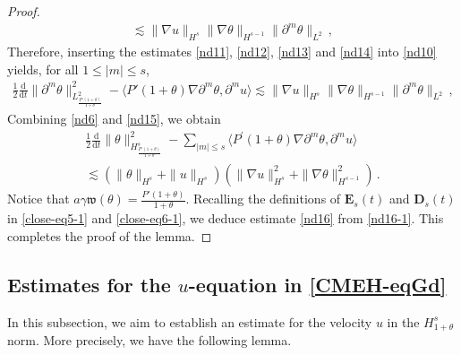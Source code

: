 \documentclass[reqno,11pt]{amsart}
\numberwithin{equation}{section}
\def\d{\mathrm{d}}
\def\w{\mathfrak{w}}
\begin{document}
\begin{proof}
\begin{equation}
\begin{aligned}
\lesssim \|\nabla u\|_{H^s} \|\nabla \theta\|_{H^{s-1}} \|\partial^m\theta\|_{L^2} \,,
\end{aligned}
\end{equation}
Therefore, inserting the estimates \eqref{nd11}, \eqref{nd12}, \eqref{nd13} and \eqref{nd14} into \eqref{nd10} yields, for all $1\le |m|\le s$,
\begin{equation}\label{nd15}
\begin{aligned}
\frac{1}{2} \frac{\d}{\d t} \|\partial^m \theta\|^2_{L^2_{\frac{P'(1+\theta)}{1+\theta}}}- \langle P'(1+\theta) \nabla \partial^m \theta, \partial^m u \rangle 
\lesssim \|\nabla u\|_{H^s} \|\nabla \theta\|_{H^{s-1}} \|\partial^m \theta\|_{L^2} \,,
\end{aligned}
\end{equation}
Combining \eqref{nd6} and \eqref{nd15}, we obtain
\begin{equation}\label{nd16-1}
\begin{aligned}
\frac{1}{2} \frac{\d}{\d t} \|\theta\|^2_{H^s_{\frac{P'(1+\theta)}{1+\theta}}} - \sum_{|m| \leq s} \langle P^\prime(1+\theta) \nabla \partial^m \theta, \partial^m u \rangle \\
\lesssim \left( \|\theta\|_{H^s} + \|u\|_{H^s} \right) \left( \|\nabla u\|_{H^s}^2 + \|\nabla \theta\|_{H^{s-1}}^2 \right) \,.
\end{aligned}
\end{equation}
Notice that $a \gamma \w (\theta) = \frac{P'(1+\theta)}{1+\theta}$. Recalling the definitions of $\mathbf{E}_s (t)$ and $\mathbf{D}_s (t)$ in \eqref{close-eq5-1} and \eqref{close-eq6-1}, we deduce estimate \eqref{nd16} from \eqref{nd16-1}. This completes the proof of the lemma.
\end{proof}

\subsection{Estimates for the $u$-equation in \eqref{CMEH-eqGd}}

In this subsection, we aim to establish an estimate for the velocity $u$ in the $H^s_{1+\theta}$ norm. More precisely, we have the following lemma.
\end{document}
